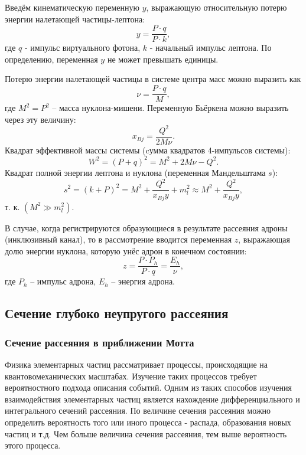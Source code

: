 \documentclass{extarticle}
\begin{document}
Введём кинематическую переменную $y$, выражающую относительную потерю энергии налетающей частицы-лептона:
\begin{equation}
    y = \frac{P \cdot q}{P \cdot k},
\end{equation}
где $q$ - импульс виртуального фотона, $k$ - начальный импульс лептона. По определению, переменная $y$ не может превышать единицы.

Потерю энергии налетающей частицы в системе центра масс можно выразить как 
\begin{equation}
    \nu = \frac{P \cdot q}{M},
\end{equation}
где $M^2 = P^2$ -- масса нуклона-мишени. Переменную Бьёркена можно выразить через эту величину:
\begin{equation}
    x_{Bj} = \frac{Q^2}{2M\nu}.
\end{equation}
Квадрат эффективной массы системы (cумма квадратов 4-импульсов системы):
\begin{equation}
	W^2 = (P+q)^2 = M^2 + 2M\nu - Q^2.
\end{equation}
Квадрат полной энергии лептона и нуклона (переменная Мандельштама $s$):
\begin{equation}
	s^2 = (k+P)^2 = M^2 + \frac{Q^2}{x_{Bj}y} + m_l^2 \approx M^2 + \frac{Q^2}{x_{Bj}y}, 
\end{equation}
т. к. $(M^2 \gg m_l^2)$. 

В случае, когда регистрируются образующиеся в результате рассеяния адроны (инклюзивный канал), то в рассмотрение вводится переменная $z$, выражающая долю энергии нуклона, которую унёс адрон в конечном состоянии:
\begin{equation}
	\label{eq:z}
	z = \frac{P \cdot P_h}{P \cdot q} = \frac{E_h}{\nu},
\end{equation}
где $P_h$ -- импульс адрона, $E_h$ -- энергия адрона. 
\subsection{Сечение глубоко неупругого рассеяния}
\subsubsection{Сечение рассеяния в приближении Мотта}
Физика элементарных частиц рассматривает процессы, происходящие на квантовомеханических масштабах. Изучение таких процессов требует вероятностного подхода описания событий. Одним из таких способов изучения взаимодействия элементарных частиц является нахождение дифференциального и интегрального сечений рассеяния. По величине сечения рассеяния можно определить вероятность того или иного процесса - распада, образования новых частиц и т.д. Чем больше величина сечения рассеяния, тем выше вероятность этого процесса.
\end{document}
